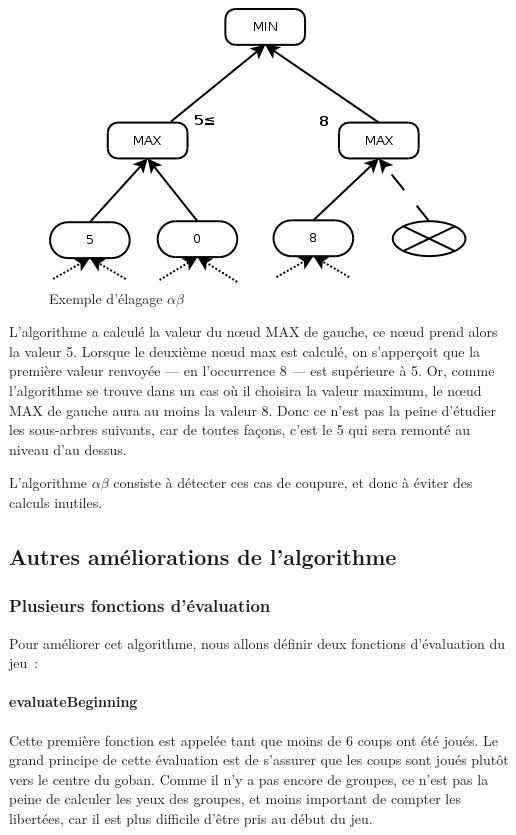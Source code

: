\documentclass[11pt,a4paper,titlepage,french]{article}
\begin{document}
				\begin{figure}[hbt]
					\label{abex}
					\begin{center}
						\includegraphics[width=\textwidth]{./alphabeta.png}
					\end{center}
					\caption{Exemple d'élagage $\alpha\beta$}
				\end{figure}

				L'algorithme a calculé la valeur du nœud MAX de gauche, ce nœud prend alors la valeur 5. Lorsque le deuxième nœud max est calculé, on s'apperçoit que la première valeur renvoyée --- en l'occurrence 8 --- est supérieure à 5. Or, comme l'algorithme se trouve dans un cas où il choisira la valeur maximum, le nœud MAX de gauche aura au moins la valeur 8. Donc ce n'est pas la peine d'étudier les sous-arbres suivants, car de toutes façons, c'est le 5 qui sera remonté au niveau d'au dessus.

				L'algorithme $\alpha\beta$ consiste à détecter ces cas de coupure, et donc à éviter des calculs inutiles.


		\subsection{Autres améliorations de l'algorithme}

			\subsubsection{Plusieurs fonctions d'évaluation}
				Pour améliorer cet algorithme, nous allons définir deux fonctions d'évaluation du jeu~:

				\paragraph{evaluateBeginning}
					Cette première fonction est appelée tant que moins de 6 coups ont été joués. Le grand principe de cette évaluation est de s'assurer que les coups sont joués plutôt vers le centre du goban. Comme il n'y a pas encore de groupes, ce n'est pas la peine de calculer les yeux des groupes, et moins important de compter les libertées, car il est plus difficile d'être pris au début du jeu.
\end{document}
